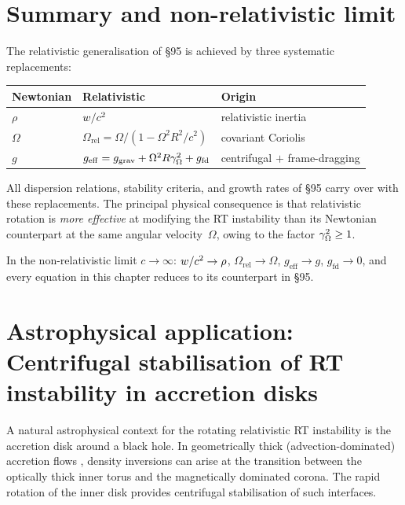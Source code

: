 \section{Summary and non-relativistic limit}
\label{sec:rel-95-summary}

The relativistic generalisation of \S95 is achieved by three
systematic replacements:

\begin{center}
\begin{tabular}{lll}
\hline
\textbf{Newtonian} & \textbf{Relativistic} & \textbf{Origin}\\
\hline
$\rho$ & $w/c^{2}$ & relativistic inertia\\
$\Omega$ & $\Omega_{\mathrm{rel}}
  = \Omega/(1-\Omega^{2}R^{2}/c^{2})$ & covariant Coriolis\\
$g$ & $g_{\mathrm{eff}}
  = g_{\mathrm{grav}}+\Omega^{2}R\gamma_{\Omega}^{2}+g_{\mathrm{fd}}$
  & centrifugal $+$ frame-dragging\\
\hline
\end{tabular}
\end{center}

\noindent
All dispersion relations, stability criteria, and growth rates of
\S95 carry over with these replacements.  The principal physical
consequence is that relativistic rotation is \emph{more effective}
at modifying the RT instability than its Newtonian counterpart at
the same angular velocity~$\Omega$, owing to the factor
$\gamma_{\Omega}^{2}\geq 1$.

In the non-relativistic limit $c\to\infty$:
$w/c^{2}\to\rho$,\;
$\Omega_{\mathrm{rel}}\to\Omega$,\;
$g_{\mathrm{eff}}\to g$,\;
$g_{\mathrm{fd}}\to 0$,
and every equation in this chapter reduces to its counterpart in \S95.

\section{Astrophysical application: Centrifugal stabilisation of RT
instability in accretion disks}\label{sec:rel-95-astro}

A natural astrophysical context for the rotating relativistic RT
instability is the accretion disk around a black hole.  In
geometrically thick (advection-dominated) accretion flows
\citep{AbramowiczFragile2013}, density inversions can arise at the
transition between the optically thick inner torus and the
magnetically dominated corona.  The rapid rotation of the inner
disk provides centrifugal stabilisation of such interfaces.

